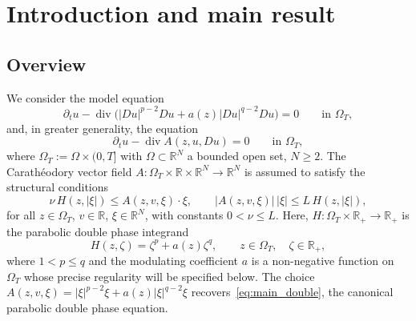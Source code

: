 \documentclass[notitlepage,11pt,reqno]{amsart}
\theoremstyle{definition}
\numberwithin{equation}{section}
\newcommand{\RR}{\mathds{R}}
\begin{document}
\section{Introduction and main result}\label{intro}
\subsection{Overview}\label{subsec:overview}
We consider the model equation
\begin{equation}\label{eq:main_double}
  \partial_t u - \operatorname{div}\!\bigl(|Du|^{p-2}Du + a(z)|Du|^{q-2}Du\bigr)
  = 0 \qquad \text{in } \Omega_T,
\end{equation}
and, in greater generality, the equation
\begin{equation}\label{eq:main equation}
  \partial_t u - \operatorname{div} A(z, u, Du) = 0 \qquad \text{in } \Omega_T,
\end{equation}
where $\Omega_T := \Omega \times (0, T]$ with $\Omega \subset \RR^N$ a
bounded open set, $N\ge 2$. The Carath\'eodory vector field
$A : \Omega_T \times \RR \times \RR^N \to \RR^N$ is
assumed to satisfy the structural conditions
\begin{equation}\label{eq:growth_cond}
  \nu\, H(z, |\xi|) \le A(z, v, \xi) \cdot \xi,
  \qquad
  |A(z, v, \xi)|\,|\xi| \le L\, H(z, |\xi|),
\end{equation}
for all $z \in \Omega_T$, $v \in \RR$, $\xi \in \RR^N$, with
constants $0 < \nu \le L$. Here, $H : \Omega_T \times \RR_+ \to
\RR_+$ is the parabolic double phase integrand
\[
  H(z, \zeta) = \zeta^p + a(z)\zeta^q,
  \qquad z \in \Omega_T,\quad \zeta \in \RR_+,
\]
where $1 < p \le q$ and the modulating coefficient $a$ is a non-negative
function on $\Omega_T$ whose precise regularity will be specified below.
The choice $A(z, v, \xi) = |\xi|^{p-2}\xi + a(z)|\xi|^{q-2}\xi$
recovers~\eqref{eq:main_double}, the canonical parabolic double phase equation.
\end{document}
